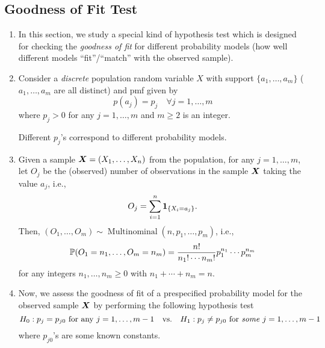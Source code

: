 \subsection{Goodness of Fit Test}
\begin{enumerate}
\item In this section, we study a special kind of hypothesis test which is
designed for checking the \emph{goodness of fit} for different probability
models (how well different models ``fit''/``match'' with the observed sample).

\item Consider a \emph{discrete} population random variable \(X\) with support
\(\{a_1,\dotsc,a_m\}\) (\(a_1,\dotsc,a_m\) are all distinct) and pmf given by
\[
p(a_j)=p_j\quad\forall j=1,\dotsc,m
\]
where \(p_j>0\) for any \(j=1,\dotsc,m\) and \(m\ge 2\) is an integer.

Different \(p_j\)'s correspond to different probability models.

\item Given a sample \(\vb*{X}=(X_1,\dotsc,X_n)\) from the population, for any
\(j=1,\dotsc,m\), let \(O_j\) be the (observed) number of observations in the
sample \(\vb*{X}\) taking the value \(a_j\), i.e.,
\[
O_j=\sum_{i=1}^{n}\mathbf{1}_{\left\{X_i=a_j\right\}}.
\]
Then, \((O_1,\dotsc,O_m)\sim\operatorname{Multinominal}(n,p_1,\dotsc,p_m)\),
i.e.,
\[
\mathbb{P}\qty(O_1=n_1,\dotsc,O_m=n_m)
=\frac{n!}{n_1!\dotsb n_m!}p_1^{n_1}\dotsb p_m^{n_m}
\]
for any integers \(n_1,\dotsc,n_m\ge 0\) with \(n_1+\dotsb+n_m=n\).

\item Now, we assess the goodness of fit of a prespecified probability model
for the observed sample \(\vb*{X}\) by performing the following hypothesis
test
\[
H_0:\text{\(p_j=p_{j0}\) for any \(j=1,\dotsc,m-1\)}\qqtext{vs.}
H_1:\text{\(p_j\ne p_{j0}\) for \emph{some} \(j=1,\dotsc,m-1\)}
\]
where \(p_{j0}\)'s are some known constants.



\end{enumerate}
